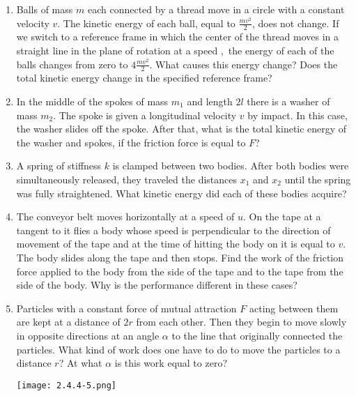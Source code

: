 \documentclass{article}
\begin{document}
\begin{enumerate}[label=2.4.\arabic*]

\item Balls of mass $m$ each connected by a thread move in a circle with a constant velocity $v$. The kinetic energy of each ball, equal to $\frac{mv^2}{2}$, does not change. If we switch to a reference frame in which the center of the thread moves in a straight line in the plane of rotation at a speed $,$ the energy of each of the balls changes from zero to $4 \frac{mv^2}{2}$. What causes this energy change? Does the total kinetic energy change in the specified reference frame?

\item  In the middle of the spokes of mass $m_1$ and length $2l$ there is a washer of mass $m_2$. The spoke is given a longitudinal velocity $v$ by impact. In this case, the washer slides off the spoke. After that, what is the total kinetic energy of the washer and spokes, if the friction force is equal to $F$?

\item  A spring of stiffness $k$ is clamped between two bodies. After both bodies were simultaneously released, they traveled the distances $x_1$ and $x_2$ until the spring was fully straightened. What kinetic energy did each of these bodies acquire?

\item The conveyor belt moves horizontally at a speed of $u$. On the tape at a tangent to it flies a body whose speed is perpendicular to the direction of movement of the tape and at the time of hitting the body on it is equal to $v$. The body slides along the tape and then stops. Find the work of the friction force applied to the body from the side of the tape and to the tape from the side of the body. Why is the performance different in these cases?

\item Particles with a constant force of mutual attraction $F$ acting between them are kept at a distance of $2r$ from each other. Then they begin to move slowly in opposite directions at an angle $\alpha$ to the line that originally connected the particles. What kind of work does one have to do to move the particles to a distance $r$? At what $\alpha$ is this work equal to zero?

\begin{center}
    \texttt{[image: 2.4.4-5.png]}
\end{center}



\end{enumerate}
\end{document}
